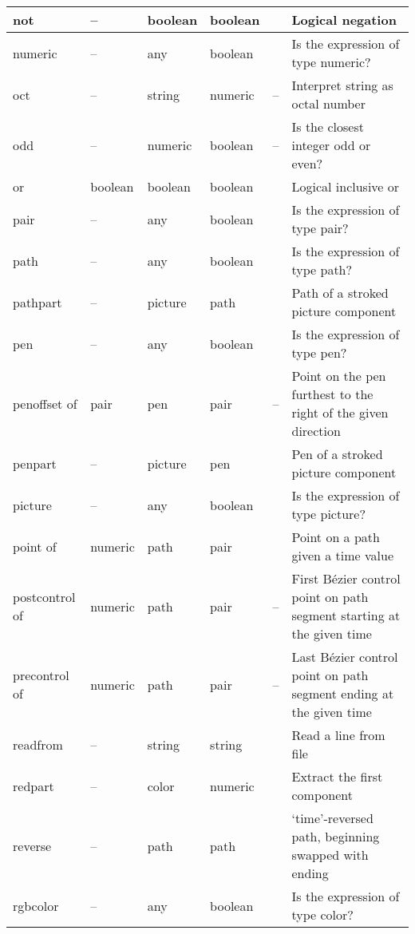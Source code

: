 \begin{longtable}{|>{\raggedright{}\ttfamily}p{.793in}*{3}{|>{\raggedright}p{.715in}}|>{\raggedleft}p{1.5em}|>{\raggedright\arraybackslash}X|}
not&  --&  boolean&  boolean&  \pageref{Dnot}&  Logical negation\\\hline
numeric&  --&  any&  boolean&  \pageref{Dnumop}&  Is the expression of type numeric?\\\hline
oct&  --&  string&  numeric&  --&  Interpret string as octal number\\\hline
odd&  --&  numeric&  boolean&  --&  Is the closest integer odd or even?\\\hline
or&  boolean&  boolean&  boolean&  \pageref{Dor}&  Logical inclusive or\\\hline
pair&  --&  any&  boolean&  \pageref{Dpairop}&  Is the expression of type pair?\\\hline
path&  --&  any&  boolean&  \pageref{Dpathop}&  Is the expression of type path?\\\hline
pathpart&  --&  picture&  path&  \pageref{Dpathpart}&  Path of a stroked picture component\\\hline
pen&  --&  any&  boolean&  \pageref{Dpenop}&  Is the expression of type pen?\\\hline
penoffset of&  pair&  pen&  pair&  --&  Point on the pen furthest to the right of the given direction\\\hline
penpart&  --&  picture&  pen&  \pageref{Dpenpart}&  Pen of a stroked picture component\\\hline
picture&  --&  any&  boolean&  \pageref{Dpictop}&  Is the expression of type picture?\\\hline
point of&  numeric&  path&  pair&  \pageref{Dpntof}&  Point on a path given a time value\\\hline
postcontrol of&  numeric&  path&  pair&  --&  First B\'ezier control point on path segment starting at the given time\\\hline
precontrol of&  numeric&  path&  pair&  --&  Last B\'ezier control point on path segment ending at the given time\\\hline
readfrom&  --&  string&  string&  \pageref{Dreadfrom}&  Read a line from file\\\hline
redpart&  --&  color&  numeric&  \pageref{Drgbprt}&  Extract the first component\\\hline
reverse&  --&  path&  path&  \pageref{Drevrse}&  `time'-reversed path, beginning swapped with ending\\\hline
rgbcolor&  --&  any&  boolean&  \pageref{Drcolrop}&  Is the expression of type color?\\\hline

\end{longtable}
